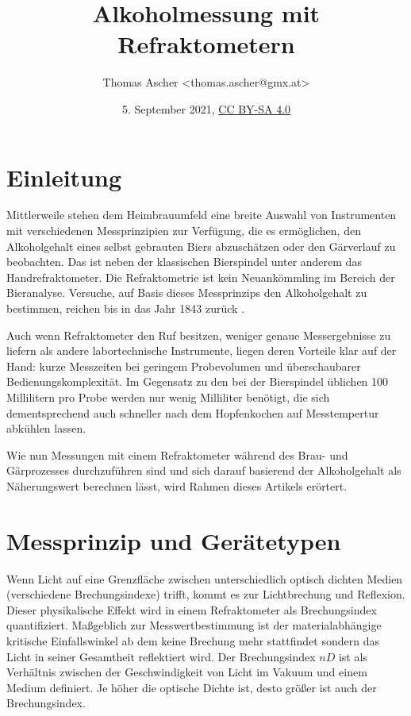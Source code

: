 \documentclass[a4paper,parskip=half]{scrartcl}
\title{Alkoholmessung mit Refraktometern}
\author{Thomas Ascher <thomas.ascher@gmx.at>}
\date{5. September 2021, \href{http://creativecommons.org/licenses/by-sa/4.0/}{CC BY-SA 4.0}}
\begin{document}
\maketitle

\section*{Einleitung}

Mittlerweile stehen dem Heimbrauumfeld eine breite Auswahl von Instrumenten
mit verschiedenen Messprinzipien zur Verfügung, die es ermöglichen, den
Alkoholgehalt eines selbst gebrauten Biers abzuschätzen oder den
Gärverlauf zu beobachten. Das ist neben der klassischen Bierspindel
unter anderem das Handrefraktometer. Die Refraktometrie ist
kein Neuankömmling im Bereich der Bieranalyse. Versuche,
auf Basis dieses Messprinzips den Alkoholgehalt zu bestimmen, reichen bis
in das Jahr 1843 zurück \autocite{Gamer1959}.

Auch wenn Refraktometer den Ruf besitzen, weniger genaue Messergebnisse
zu liefern als andere labortechnische Instrumente, liegen deren
Vorteile klar auf der Hand: kurze Messzeiten bei geringem Probevolumen
und überschaubarer Bedienungskomplexität. Im Gegensatz zu den bei der
Bierspindel üblichen 100 Millilitern pro Probe werden nur wenig
Milliliter benötigt, die sich dementsprechend auch schneller nach dem
Hopfenkochen auf Messtempertur abkühlen lassen. \autocite{Bettner1969, Terrill2011}

Wie nun Messungen mit einem Refraktometer während des Brau- und
Gärprozesses durchzuführen sind und sich darauf basierend der
Alkoholgehalt als Näherungswert berechnen lässt, wird
Rahmen dieses Artikels erörtert.

\section*{Messprinzip und Gerätetypen}

Wenn Licht auf eine Grenzfläche zwischen unterschiedlich optisch
dichten Medien (verschiedene Brechungsindexe) trifft,
kommt es zur Lichtbrechung und Reflexion. Dieser physikalische Effekt
wird in einem Refraktometer als Brechungsindex quantifiziert.
Maßgeblich zur Messwertbestimmung ist der materialabhängige
kritische Einfallswinkel ab dem keine Brechung mehr stattfindet
sondern das Licht in seiner Gesamtheit reflektiert wird.
Der Brechungsindex \(\mathit{nD}\) ist als Verhältnis zwischen der
Geschwindigkeit von Licht im Vakuum und einem Medium definiert. Je höher
die optische Dichte ist, desto größer ist auch der Brechungsindex.
\autocite{AKRSSOGH2021,Bonham2001,Gamer1959}
\end{document}

